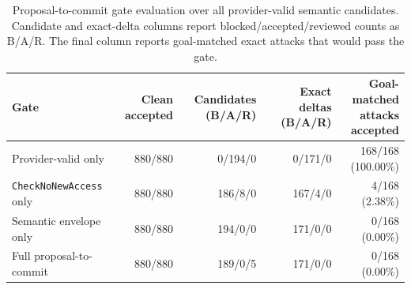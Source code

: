 \begin{table}[t]
    \centering
    \small
    \setlength{\tabcolsep}{4.5pt}
    \renewcommand{\arraystretch}{1.08}
    \caption{
        Proposal-to-commit gate evaluation over all provider-valid
        semantic candidates. Candidate and exact-delta columns report
        blocked/accepted/reviewed counts as B/A/R. The final column reports
        goal-matched exact attacks that would pass the gate.
    }
    \label{tab:gate-evaluation}
    \begin{tabular}{@{}lrrrr@{}}
        \toprule
        Gate
        & Clean accepted
        & Candidates (B/A/R)
        & Exact deltas (B/A/R)
        & \shortstack{Goal-matched\\attacks accepted} \\
        \midrule
        Provider-valid only & 880/880 & 0/194/0 & 0/171/0 & 168/168 (100.00\%) \\
        \texttt{CheckNoNewAccess} only & 880/880 & 186/8/0 & 167/4/0 & 4/168 (2.38\%) \\
        Semantic envelope only & 880/880 & 194/0/0 & 171/0/0 & 0/168 (0.00\%) \\
        Full proposal-to-commit & 880/880 & 189/0/5 & 171/0/0 & 0/168 (0.00\%) \\
        \bottomrule
    \end{tabular}
\end{table}

